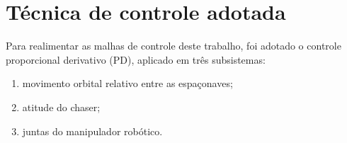\section{Técnica de controle adotada}
\label{sec:tecnica_pd}

Para realimentar as malhas de controle deste trabalho, foi adotado o controle proporcional derivativo (PD), aplicado em três subsistemas:
\begin{enumerate}[label=\roman*.]
    \item movimento orbital relativo entre as espaçonaves;
    \item atitude do chaser;
    \item juntas do manipulador robótico.
\end{enumerate}




% 

